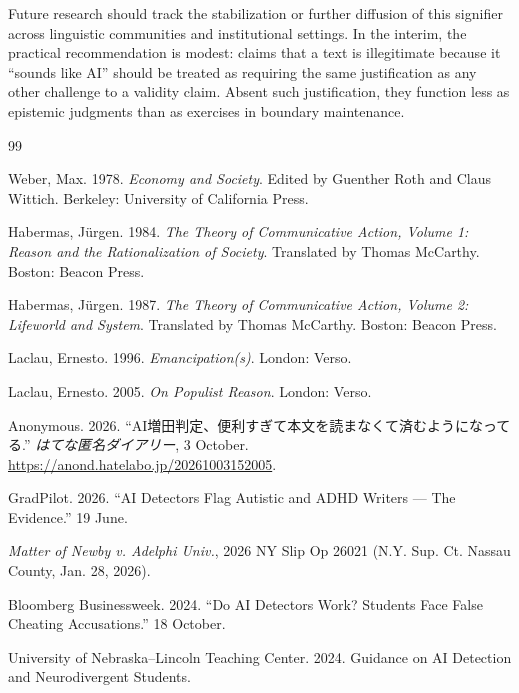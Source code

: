 \documentclass[12pt,a4paper]{article}
\begin{document}
Future research should track the stabilization or further diffusion of this signifier across linguistic communities and institutional settings. In the interim, the practical recommendation is modest: claims that a text is illegitimate because it ``sounds like AI'' should be treated as requiring the same justification as any other challenge to a validity claim. Absent such justification, they function less as epistemic judgments than as exercises in boundary maintenance.


\begin{thebibliography}{99}

Weber, Max. 1978. \emph{Economy and Society}. Edited by Guenther Roth and Claus Wittich. Berkeley: University of California Press.

Habermas, Jürgen. 1984. \emph{The Theory of Communicative Action, Volume 1: Reason and the Rationalization of Society}. Translated by Thomas McCarthy. Boston: Beacon Press.

Habermas, Jürgen. 1987. \emph{The Theory of Communicative Action, Volume 2: Lifeworld and System}. Translated by Thomas McCarthy. Boston: Beacon Press.

Laclau, Ernesto. 1996. \emph{Emancipation(s)}. London: Verso.

Laclau, Ernesto. 2005. \emph{On Populist Reason}. London: Verso.

Anonymous. 2026. ``AI増田判定、便利すぎて本文を読まなくて済むようになってる.'' \emph{はてな匿名ダイアリー}, 3 October. \url{https://anond.hatelabo.jp/20261003152005}.

GradPilot. 2026. ``AI Detectors Flag Autistic and ADHD Writers — The Evidence.'' 19 June.

\textit{Matter of Newby v. Adelphi Univ.}, 2026 NY Slip Op 26021 (N.Y. Sup. Ct. Nassau County, Jan. 28, 2026).

Bloomberg Businessweek. 2024. ``Do AI Detectors Work? Students Face False Cheating Accusations.'' 18 October.

University of Nebraska–Lincoln Teaching Center. 2024. Guidance on AI Detection and Neurodivergent Students.


\end{thebibliography}
\end{document}
